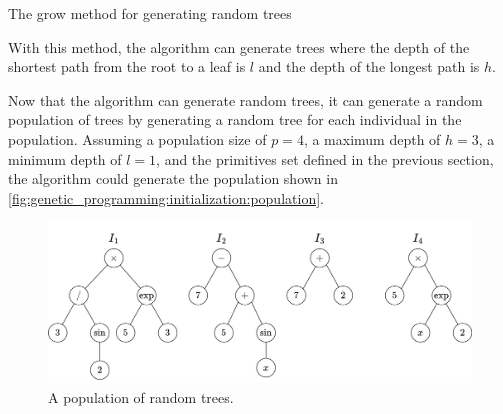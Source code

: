   \begin{algorithm}[ht!]
    \caption{The grow method for generating random trees}
    \label{alg:genetic_programming:initialization:grow}
  \end{algorithm}

  With this method, the algorithm can generate trees where the depth of the 
  shortest path from the root to a leaf is \(l\) and the depth of the longest
  path is \(h\).

  Now that the algorithm can generate random trees, it can generate a random
  population of trees by generating a random tree for each individual in the
  population.
  Assuming a population size of \(p = 4\), a maximum depth of \(h = 3\), a
  minimum depth of \(l = 1\), and the primitives set defined in the previous
  section, the algorithm could generate the population shown in
  \vref{fig:genetic_programming:initialization:population}.

  \begin{figure}[ht!]
    \centering
    \includegraphics[width=\textwidth]{img/theoretical_framework/GP Initial Population.png}
    \caption{A population of random trees.}
    \label{fig:genetic_programming:initialization:population}
  \end{figure}

